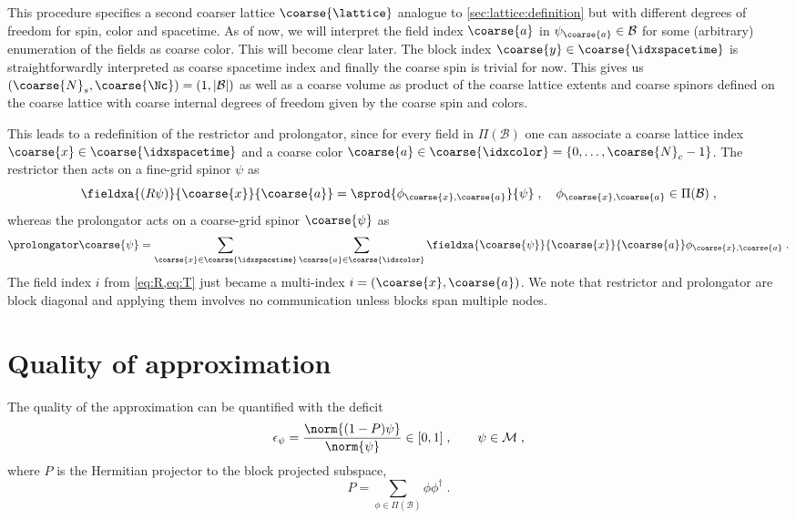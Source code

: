 This procedure specifies a second coarser lattice $\coarse{\lattice}$ analogue to \cref{sec:lattice:definition} but with different degrees of freedom for spin, color and spacetime.
As of now, we will interpret the field index $\coarse{a}$ in $\psi_{\coarse{a}} \in \mathcal{B}$ for some (arbitrary) enumeration of the fields as coarse color.
This will become clear later.
The block index $\coarse{y} \in \coarse{\idxspacetime}$ is straightforwardly interpreted as coarse spacetime index and finally the coarse spin is trivial for now.
This gives us $(\coarse{N}_s, \coarse{\Nc}) = (1, \lvert \mathcal{B} \rvert)$ as well as a coarse volume as product of the coarse lattice extents and coarse spinors defined on the coarse lattice with coarse internal degrees of freedom given by the coarse spin and colors.

This leads to a redefinition of the restrictor and prolongator, since for every field in $\Pi(\mathcal{B})$ one can associate a coarse lattice index $\coarse{x} \in \coarse{\idxspacetime}$ and a coarse color $\coarse{a} \in \coarse{\idxcolor} = \{0, \ldots, \coarse{N}_c-1 \}$.
The restrictor then acts on a fine-grid spinor $\psi$ as
\begin{equation} \label{eq:R:redef:1}
\fieldxa{(R \psi)}{\coarse{x}}{\coarse{a}} = \sprod{\phi_{\coarse{x}, \coarse{a}}}{\psi} \;,
\quad
\phi_{\coarse{x}, \coarse{a}} \in \Pi(\mathcal{B}) \;,
\end{equation}
whereas the prolongator acts on a coarse-grid spinor $\coarse{\psi}$ as
\begin{equation} \label{eq:T:redef:1}
\prolongator \coarse{\psi} =
\sum_{\coarse{x} \in \coarse{\idxspacetime}}
\sum_{\coarse{a} \in \coarse{\idxcolor}}
    \fieldxa{\coarse{\psi}}{\coarse{x}}{\coarse{a}} \phi_{\coarse{x}, \coarse{a}} \;.
\end{equation}
The field index $i$ from \cref{eq:R,eq:T} just became a multi-index $i = (\coarse{x}, \coarse{a})$.
We note that restrictor and prolongator are block diagonal and applying them involves no communication unless blocks span multiple nodes.

\section{Quality of approximation}
\label{sec:lc:deficit}

The quality of the approximation can be quantified with the deficit
\begin{equation}
\epsilon_{\psi} = \frac{\norm{ (1-P) \psi }}{\norm{\psi}} \in [0,1] \;,
\qquad
\psi \in \mathcal{M} \;,
\end{equation}
where $P$ is the Hermitian projector to the block projected subspace,
\begin{equation} \label{eq:lc:projector}
P = \sum_{\phi \in \Pi(\mathcal{B})} \phi \phi^{\dagger} \;.
\end{equation}

